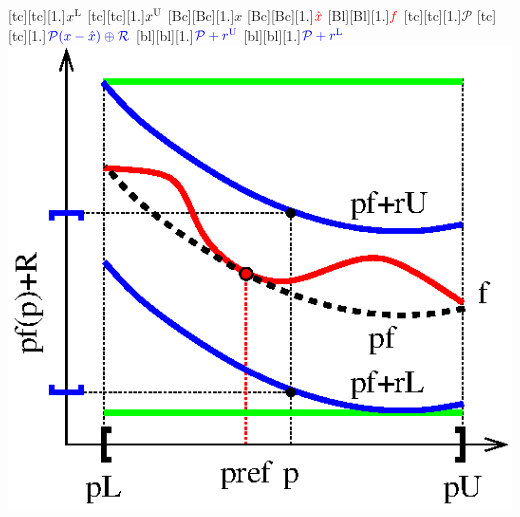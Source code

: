 \documentclass[a4paper,12pt]{article}
\begin{document}
[tc][tc][1.]{$x^{\rm L}$}
[tc][tc][1.]{$x^{\rm U}$}
[Bc][Bc][1.]{$x$}
[Bc][Bc][1.]{$\color{red}\hat{x}$}
[Bl][Bl][1.]{$\color{red}f$}
[tc][tc][1.]{$\mathcal P$}
[tc][tc][1.]{$\color{blue}\mathcal P(x-\hat x)\oplus\mathcal R$}
[bl][bl][1.]{$\color{blue}\mathcal P+r^{\rm U}$}
[bl][bl][1.]{$\color{blue}\mathcal P+r^{\rm L}$}
\includegraphics[width=.45\textwidth]{Taylormodel.eps}
\end{document}
